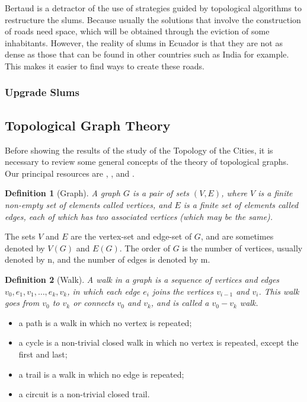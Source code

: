 \documentclass[10pt]{article}
\newtheorem{definition}{Definition}
\begin{document}
Bertaud is a detractor of the use of strategies guided by topological algorithms to restructure the slums. Because usually the solutions that involve the construction of roads need space, which will be obtained through the eviction of some inhabitants\cite{Ornes9686}. However, the reality of slums in Ecuador is that they are not as dense as those that can be found in other countries such as India for example. This makes it easier to find ways to create these roads. 

\subsubsection{Upgrade Slums}


\subsection{Topological Graph Theory}
Before showing the results of the study of the Topology of the Cities, it is necessary to review some general concepts of the theory of topological graphs. Our principal resources are \cite{gross2009topics}, \cite{bonnington2012foundations}, \cite{gross1987topological} and \cite{richeson2008euler}.\\

\begin{definition}[Graph]
A graph $G$ is a pair of sets $(V , E)$, where $V$ is a finite non-empty set of elements called vertices, and $E$ is a finite set of elements called edges, each of which has two associated vertices (which may be the same).
\end{definition}

The sets $V$ and $E$ are the vertex-set and edge-set of $G$, and are sometimes denoted by $V(G)$ and $E(G)$. The order of $G$ is the number of vertices, usually denoted by n, and the number of edges is denoted by m.

\begin{definition}[Walk]
A walk in a graph is a sequence of vertices and edges $v_0, e_1, v_1, \dots, e_k, v_k$, in which each edge $e_i$ joins the vertices $v_{i-1}$ and $v_i$. This walk goes from $v_0$ to $v_k$ or connects $v_0$ and $v_k$, and is called a $v_0-v_k$ walk.
\end{definition}

\begin{itemize}
    \item a path is a walk in which no vertex is repeated;
    \item a cycle is a non-trivial closed walk in which no vertex is repeated, except the first and last;
    \item a trail is a walk in which no edge is repeated;
    \item a circuit is a non-trivial closed trail.
\end{itemize}
\end{document}
